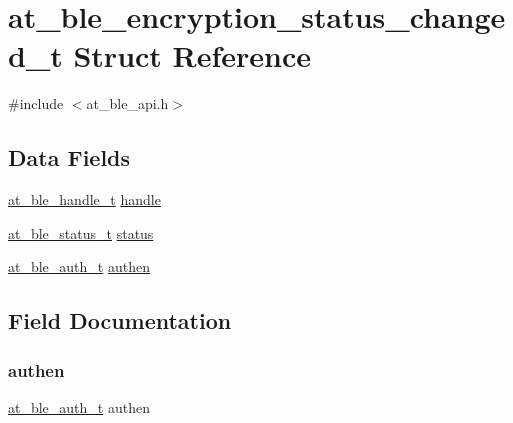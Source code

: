 \hypertarget{structat__ble__encryption__status__changed__t}{}\section{at\+\_\+ble\+\_\+encryption\+\_\+status\+\_\+changed\+\_\+t Struct Reference}
\label{structat__ble__encryption__status__changed__t}


{\ttfamily \#include $<$at\+\_\+ble\+\_\+api.\+h$>$}

\subsection*{Data Fields}
\begin{DoxyCompactItemize}
\item 
\mbox{\hyperlink{at__ble__api_8h_abd23646d0c662860741f787efc8456f2}{at\+\_\+ble\+\_\+handle\+\_\+t}} \mbox{\hyperlink{structat__ble__encryption__status__changed__t_ab8b0f353cb6a8d85f0822900e3b7cf35}{handle}}
\item 
\mbox{\hyperlink{group__error__codes__group_ga3b1db9b95feb157b3c188ca27fe76988}{at\+\_\+ble\+\_\+status\+\_\+t}} \mbox{\hyperlink{structat__ble__encryption__status__changed__t_a0b48093fc2030779fc47e5216f8019e2}{status}}
\item 
\mbox{\hyperlink{at__ble__api_8h_a70253ec09a2361d16e15c37f8cb5b97c}{at\+\_\+ble\+\_\+auth\+\_\+t}} \mbox{\hyperlink{structat__ble__encryption__status__changed__t_ae9b8d2a2c2d1822860c885690db45392}{authen}}
\end{DoxyCompactItemize}


\subsection{Field Documentation}
\mbox{\label{structat__ble__encryption__status__changed__t_ae9b8d2a2c2d1822860c885690db45392}} 
\subsubsection{\texorpdfstring{authen}{authen}}
{\footnotesize\ttfamily \mbox{\hyperlink{at__ble__api_8h_a70253ec09a2361d16e15c37f8cb5b97c}{at\+\_\+ble\+\_\+auth\+\_\+t}} authen}

